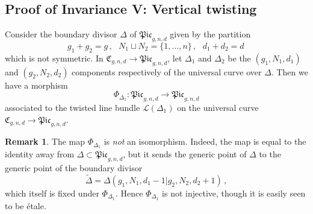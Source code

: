 \documentclass[a4paper,12pt]{article} %
\theoremstyle{definition}
\newtheorem{remark}[definition]{Remark}
\theoremstyle{plain}%
\newcommand{\Picabs}{\mathfrak{Pic}}
\newcommand{\Picrel}{\mathfrak{Pic}^{\mathrm{rel}}}
\newcommand{\Chow}{\mathsf{CH}}
\newcommand{\CHop}{\Chow_{\mathsf{op}}}
\newcommand{\invnrIII}{V}
\newcommand{\jocomment}[1]{}
\begin{document}


\subsection{Proof of Invariance \invnrIII{}: {\rm Vertical twisting}}
Consider the boundary divisor $\Delta$ of $\Picabs_{g,n,d}$ given by the partition 
\begin{equation*}
g_1+g_2=g\, , \ \ \ N_1\sqcup N_2 = \{1,\ldots,n\}\,, \ \ \ d_1+d_2=d\, 
\end{equation*}
which is not symmetric.
In  $\mathfrak{C}_{g,n,d} \to \Picabs_{g,n,d}$, let $\Delta_1$ and $\Delta_2$ be the $(g_1,N_1,d_1)$
and $(g_2,N_2,d_2)$ components respectively
of the universal curve over $\Delta$.
Then we have a morphism
\[\Phi_{\Delta_1} : \Picabs_{g,n,d} \to \Picabs_{g,n,d}\]
associated to the twisted line bundle $\mathcal{L}(\Delta_1)$ on the universal curve $\mathfrak{C}_{g,n,d} \to \Picabs_{g,n,d}$. 

\begin{remark}
The map $\Phi_{\Delta_1}$ is \emph{not} an isomorphism. Indeed, the map is equal to the identity away from $\Delta \subset \Picabs_{g,n,d}$, but it sends the generic point of $\Delta$ to the generic point of the boundary divisor 
$$\widetilde \Delta = \Delta(g_1, N_1, d_1-1|g_2, N_2, d_2+1)\, ,$$ which itself is fixed under $\Phi_{\Delta_1}$. Hence $\Phi_{\Delta_1}$ is not injective, though it is easily seen to be \'etale. 
\end{remark}

\end{document}
